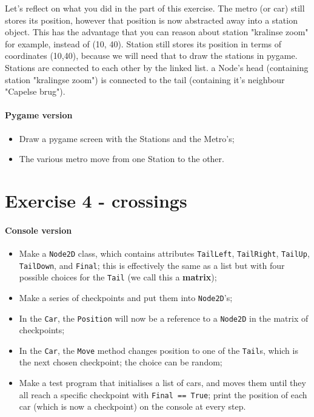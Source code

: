 \documentclass[12pt,a4paper]{article}
\begin{document}
		    Let's reflect on what you did in the part of this exercise.
		    The metro (or car) still stores its position, however that position is now abstracted away into a station object.
		    This has the advantage that you can reason about station "kralinse zoom" for example, instead of (10, 40).
		    Station still stores its position in terms of coordinates (10,40), because we will need that to draw the stations in pygame.
		    Stations are connected to each other by the linked list. a Node's head (containing station "kralingse zoom") is connected to the tail (containing it's neighbour "Capelse brug").


		\paragraph*{Pygame version}
			\begin{itemize}
				\item Draw a pygame screen with the Stations and the Metro's;
				\item The various metro move from one Station to the other.
			\end{itemize}

	\section{Exercise 4 - crossings}
		\paragraph*{Console version}
			\begin{itemize}
				\item Make a \texttt{Node2D} class, which contains attributes \texttt{TailLeft}, \texttt{TailRight}, \texttt{TailUp}, \texttt{TailDown}, and \texttt{Final}; this is effectively the same as a list but with four possible choices for the \texttt{Tail} (we call this a \textbf{matrix});
				\item Make a series of checkpoints and put them into \texttt{Node2D}'s;
				\item In the \texttt{Car}, the \texttt{Position} will now be a reference to a \texttt{Node2D} in the matrix of checkpoints;
				\item In the \texttt{Car}, the \texttt{Move} method changes position to one of the \texttt{Tail}s, which is the next chosen checkpoint; the choice can be random;
				\item Make a test program that initialises a list of cars, and moves them until they all reach a specific checkpoint with \texttt{Final == True}; print the position of each car (which is now a checkpoint) on the console at every step.
			\end{itemize}
			
\end{document}
